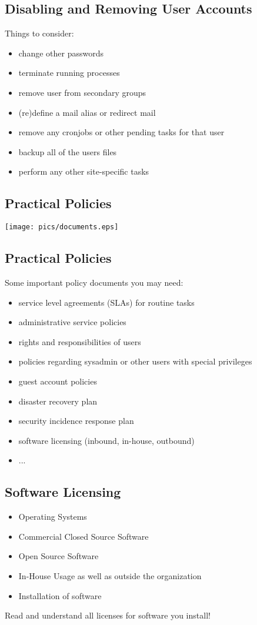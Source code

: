 \documentclass[xga]{xdvislides}
\begin{document}
\subsection{Disabling and Removing User Accounts}
Things to consider:
\begin{itemize}
	\item change other passwords
	\item terminate running processes
	\item remove user from secondary groups
	\item (re)define a mail alias or redirect mail
	\item remove any cronjobs or other pending tasks for that user
	\item backup all of the users files
	\item perform any other site-specific tasks
\end{itemize}

\subsection{Practical Policies}

\begin{center}
	\texttt{[image: pics/documents.eps]}
\end{center}

\subsection{Practical Policies}
Some important policy documents you may need:
\begin{itemize}
	\item service level agreements (SLAs) for routine tasks
	\item administrative service policies
	\item rights and responsibilities of users
	\item policies regarding sysadmin or other users with special
		privileges
	\item guest account policies
	\item disaster recovery plan
	\item security incidence response plan
	\item software licensing (inbound, in-house, outbound)
	\item ...
\end{itemize}

\subsection{Software Licensing}
\begin{itemize}
	\item Operating Systems
	\item Commercial Closed Source Software
	\item Open Source Software
	\item In-House Usage as well as outside the organization
	\item Installation of software
\end{itemize}
\addvspace{.5in}
Read and understand all licenses for software you install!
\end{document}
